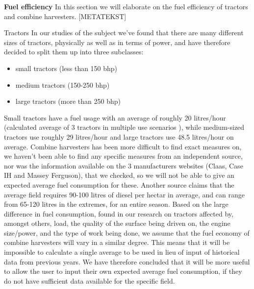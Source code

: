 \textbf{Fuel efficiency} \newline
In this section we will elaborate on the fuel efficiency of tractors and combine harvesters.
[METATEKST]

Tractors
In our studies of the subject we've found that there are many different sizes of tractors, physically as well as in terms of power, and have therefore decided to split them up into three subclasses:
\begin{itemize}[noitemsep]
    \item small tractors (less than 150 bhp)
    \item medium tractors (150-250 bhp)
    \item large tractors (more than 250 bhp)
\end{itemize}
Small tractors have a fuel usage with an average of roughly 20 litres/hour (calculated average of 3 tractors in multiple use scenarios \cite{dlg:case_maxxum_130}\cite{dlg:john_deere_6125R}\cite{dlg:fendt-313-scr}), while medium-sized tractors use roughly 29 litres/hour\cite{dlg:fendt-724-scr}\cite{dlg:claas_arion_650}\cite{dlg:claas_axion_850} and large tractors use 48.5 litres/hour on average\cite{dlg:fendt_939}\cite{dlg:john_deere_8335}\cite{dlg:claas_axion_950}.
Combine harvesters has been more difficult to find exact measures on, we haven't been able to find any specific measures from an independent source, nor was the information available on the 3 manufacturers websites (Claas, Case IH and Massey Ferguson), that we checked, so we will not be able to give an expected average fuel consumption for these.
Another source \cite{erfarland:dieselforbrug} claims that the average field requires 90-100 litres of diesel per hectar in average, and can range from 65-120 litres in the extremes, for an entire season.
Based on the large difference in fuel consumption, found in our research on tractors affected by, amongst others, load, the quality of the surface being driven on, the engine size/power, and the type of work being done, we assume that the fuel economy of combine harvesters will vary in a similar degree. This means that it will be impossible to calculate a single average to be used in lieu of input of historical data from previous years. We have therefore concluded that it will be more useful to allow the user to input their own expected average fuel consumption, if they do not have sufficient data available for the specific field. 
